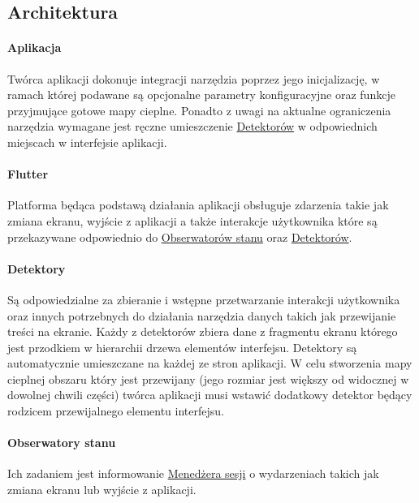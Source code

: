 \subsection{Architektura}

\paragraph{Aplikacja}
Twórca aplikacji dokonuje integracji narzędzia poprzez jego inicjalizację, w ramach której podawane są  opcjonalne parametry konfiguracyjne oraz funkcje przyjmujące gotowe mapy cieplne. Ponadto z uwagi na aktualne ograniczenia narzędzia wymagane jest ręczne umieszczenie \hyperref[par:rs_detectors]{Detektorów} w odpowiednich miejscach w interfejsie aplikacji.

\paragraph{Flutter} Platforma będąca podstawą działania aplikacji obsługuje zdarzenia takie jak zmiana ekranu, wyjście z aplikacji a także interakcje użytkownika które są przekazywane odpowiednio do \hyperref[par:rs_observers]{Obserwatorów stanu} oraz \hyperref[par:rs_detectors]{Detektorów}.

\paragraph{Detektory} 
\label{par:rs_detectors}
Są odpowiedzialne za zbieranie i wstępne przetwarzanie interakcji użytkownika oraz innych potrzebnych do działania narzędzia danych takich jak przewijanie treści na ekranie. Każdy z detektorów zbiera dane z fragmentu ekranu którego jest przodkiem w hierarchii drzewa elementów interfejsu. Detektory są automatycznie umieszczane na każdej ze stron aplikacji. W celu stworzenia mapy cieplnej obszaru który jest przewijany (jego rozmiar jest większy od widocznej w dowolnej chwili części) twórca aplikacji musi wstawić dodatkowy detektor będący rodzicem przewijalnego elementu interfejsu.

\paragraph{Obserwatory stanu} 
\label{par:rs_observers}
Ich zadaniem jest informowanie \hyperref[par:rs_session_manager]{Menedżera sesji} o wydarzeniach takich jak zmiana ekranu lub wyjście z aplikacji.

